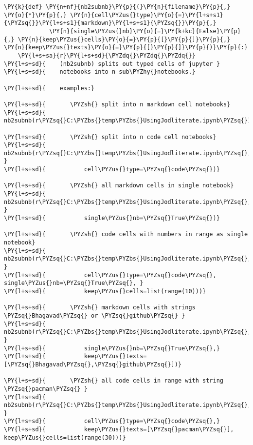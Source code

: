    \begin{tcolorbox}[breakable, size=fbox, boxrule=1pt, pad at break*=1mm,colback=cellbackground, colframe=cellborder]
\begin{Verbatim}[commandchars=\\\{\}]
\PY{k}{def} \PY{n+nf}{nb2subnb}\PY{p}{(}\PY{n}{filename}\PY{p}{,} \PY{o}{*}\PY{p}{,} \PY{n}{cell\PYZus{}type}\PY{o}{=}\PY{l+s+s1}{\PYZsq{}}\PY{l+s+s1}{markdown}\PY{l+s+s1}{\PYZsq{}}\PY{p}{,} 
             \PY{n}{single\PYZus{}nb}\PY{o}{=}\PY{k+kc}{False}\PY{p}{,} \PY{n}{keep\PYZus{}cells}\PY{o}{=}\PY{p}{[}\PY{p}{]}\PY{p}{,} \PY{n}{keep\PYZus{}texts}\PY{o}{=}\PY{p}{[}\PY{p}{]}\PY{p}{)}\PY{p}{:}
    \PY{l+s+sa}{r}\PY{l+s+sd}{\PYZdq{}\PYZdq{}\PYZdq{}}
\PY{l+s+sd}{    (nb2subnb) splits out typed cells of jupyter }
\PY{l+s+sd}{    notebooks into n sub\PYZhy{}notebooks.}

\PY{l+s+sd}{    examples:}

\PY{l+s+sd}{       \PYZsh{} split into n markdown cell notebooks}
\PY{l+s+sd}{       nb2subnb(r\PYZsq{}C:\PYZbs{}temp\PYZbs{}UsingJodliterate.ipynb\PYZsq{})}

\PY{l+s+sd}{       \PYZsh{} split into n code cell notebooks}
\PY{l+s+sd}{       nb2subnb(r\PYZsq{}C:\PYZbs{}temp\PYZbs{}UsingJodliterate.ipynb\PYZsq{}, }
\PY{l+s+sd}{           cell\PYZus{}type=\PYZsq{}code\PYZsq{})}

\PY{l+s+sd}{       \PYZsh{} all markdown cells in single notebook}
\PY{l+s+sd}{       nb2subnb(r\PYZsq{}C:\PYZbs{}temp\PYZbs{}UsingJodliterate.ipynb\PYZsq{}, }
\PY{l+s+sd}{           single\PYZus{}nb=\PYZsq{}True\PYZsq{})}

\PY{l+s+sd}{       \PYZsh{} code cells with numbers in range as single notebook}
\PY{l+s+sd}{       nb2subnb(r\PYZsq{}C:\PYZbs{}temp\PYZbs{}UsingJodliterate.ipynb\PYZsq{}, }
\PY{l+s+sd}{           cell\PYZus{}type=\PYZsq{}code\PYZsq{}, single\PYZus{}nb=\PYZsq{}True\PYZsq{}, }
\PY{l+s+sd}{           keep\PYZus{}cells=list(range(10)))}

\PY{l+s+sd}{       \PYZsh{} markdown cells with strings \PYZsq{}Bhagavad\PYZsq{} or \PYZsq{}github\PYZsq{} }
\PY{l+s+sd}{       nb2subnb(r\PYZsq{}C:\PYZbs{}temp\PYZbs{}UsingJodliterate.ipynb\PYZsq{}, }
\PY{l+s+sd}{           single\PYZus{}nb=\PYZsq{}True\PYZsq{},}
\PY{l+s+sd}{           keep\PYZus{}texts=[\PYZsq{}Bhagavad\PYZsq{},\PYZsq{}github\PYZsq{}])}

\PY{l+s+sd}{       \PYZsh{} all code cells in range with string \PYZsq{}pacman\PYZsq{} }
\PY{l+s+sd}{       nb2subnb(r\PYZsq{}C:\PYZbs{}temp\PYZbs{}UsingJodliterate.ipynb\PYZsq{}, }
\PY{l+s+sd}{           cell\PYZus{}type=\PYZsq{}code\PYZsq{},}
\PY{l+s+sd}{           keep\PYZus{}texts=[\PYZsq{}pacman\PYZsq{}], keep\PYZus{}cells=list(range(30)))}


\end{Verbatim}
\end{tcolorbox}
